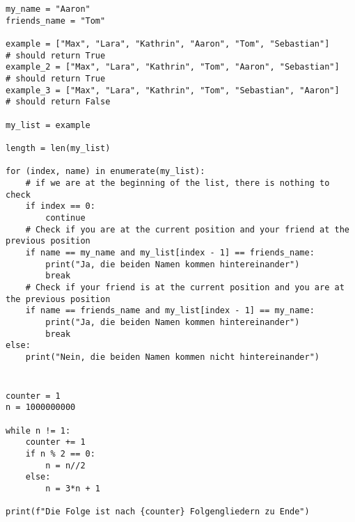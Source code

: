\documentclass[a4paper]{article}
\begin{document}
\section{} 
\begin{verbatim}
my_name = "Aaron"
friends_name = "Tom"

example = ["Max", "Lara", "Kathrin", "Aaron", "Tom", "Sebastian"]     # should return True
example_2 = ["Max", "Lara", "Kathrin", "Tom", "Aaron", "Sebastian"]   # should return True
example_3 = ["Max", "Lara", "Kathrin", "Tom", "Sebastian", "Aaron"]   # should return False

my_list = example

length = len(my_list)

for (index, name) in enumerate(my_list):
    # if we are at the beginning of the list, there is nothing to check
    if index == 0:
        continue
    # Check if you are at the current position and your friend at the previous position
    if name == my_name and my_list[index - 1] == friends_name:
        print("Ja, die beiden Namen kommen hintereinander")
        break
    # Check if your friend is at the current position and you are at the previous position
    if name == friends_name and my_list[index - 1] == my_name:
        print("Ja, die beiden Namen kommen hintereinander")
        break
else:
    print("Nein, die beiden Namen kommen nicht hintereinander")
\end{verbatim}

\section{}
\begin{verbatim}
counter = 1
n = 1000000000

while n != 1:
    counter += 1
    if n % 2 == 0:
        n = n//2
    else:
        n = 3*n + 1

print(f"Die Folge ist nach {counter} Folgengliedern zu Ende")
\end{verbatim}
\end{document}
